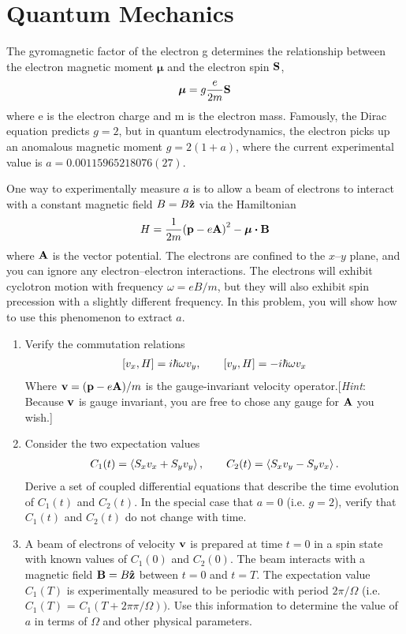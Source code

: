 \section{Quantum Mechanics}
\begin{problem}
  The gyromagnetic factor of the electron g determines the relationship between the electron magnetic moment $\bm{\mu}$ and the electron spin $\vb{S}$,
  \begin{align*}
    \bm{\mu}=g\frac{e}{2m}\vb{S}
  \end{align*}
  where e is the electron charge and m is the electron mass. Famously, the Dirac equation predicts $g = 2$, but in quantum electrodynamics, the electron picks up an anomalous magnetic moment $g = 2(1 + a)$, where the current experimental value is $a = 0.00115965218076(27)$.

  One way to experimentally measure $a$ is to allow a beam of electrons to interact with a constant magnetic field $B = B\vu{z}$ via the Hamiltonian
  \begin{align*}
    H=\frac1{2m}\qty(\vb{p}-e\vb{A})^2-\bm{\mu}\vdot\vb{B}
  \end{align*}
  where $\vb{A}$ is the vector potential. The electrons are confined to the $x–y$ plane, and you can ignore any electron–electron interactions. The electrons will exhibit cyclotron motion with frequency $\omega = eB/m$, but they will also exhibit spin precession with a slightly different frequency. In this problem, you will show how to use this phenomenon to extract $a$.
  \begin{enumerate}[label=(\alph*)]
  \item Verify the commutation relations
    \begin{align*}
      \comm{v_x}{H}=i\hbar\omega v_y,\qquad
      \comm{v_y}{H}=-i\hbar\omega v_x
    \end{align*}
    Where $\vb{v}=(\vb{p}-e\vb{A})/m$ is the gauge-invariant velocity operator.\@[\emph{Hint}: Because $\vb{v}$ is gauge invariant, you are free to chose any gauge for $\vb{A}$ you wish.]
  \item Consider the two expectation values
    \begin{align*}
      C_1(t) = \ev{S_xv_x+S_yv_y}, \qquad
      C_2(t) = \ev{S_xv_y-S_yv_x} .
    \end{align*}
    Derive a set of coupled differential equations that describe the time evolution of $C_1(t)$ and $C_2(t)$. In the special case that $a = 0$ (i.e. $g = 2$), verify that $C_1(t)$ and $C_2(t)$ do not change with time.
  \item A beam of electrons of velocity $\vb{v}$ is prepared at time $t = 0$ in a spin state with known values of $C_1(0)$ and $C_2(0)$. The beam interacts with a magnetic field $\vb{B} = B\vu{z}$ between $t = 0$ and $t = T$. The expectation value $C_1(T)$ is experimentally measured to be periodic with period $2\pi/\Omega$ (i.e. $C_1(T)$ = $C_1(T+2π\pi/\Omega))$. Use this information to determine the value of $a$ in terms of $\Omega$ and other physical parameters.
  \end{enumerate}
\end{problem}
